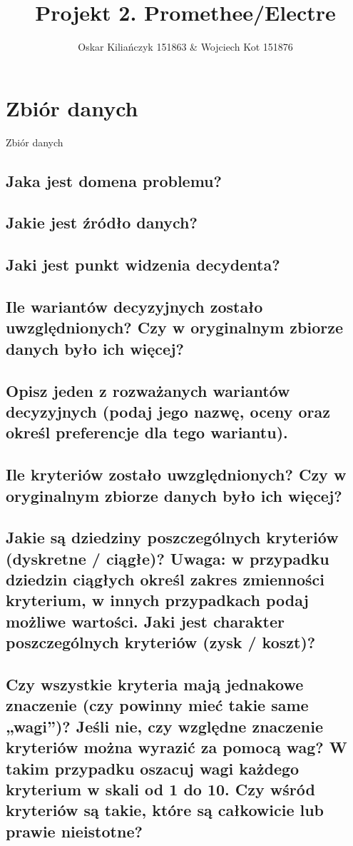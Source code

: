 \documentclass[11pt]{article}
\title{Projekt 2. Promethee/Electre}
\author{Oskar Kiliańczyk 151863 \& Wojciech Kot 151876}
\date{}
\begin{document}
\maketitle
\newpage

\section{Zbiór danych}
Zbiór danych
\subsection{Jaka jest domena problemu?}

\subsection{Jakie jest źródło danych?}

\subsection{Jaki jest punkt widzenia decydenta?}

\subsection{Ile wariantów decyzyjnych zostało uwzględnionych? Czy w oryginalnym zbiorze danych było ich więcej?}

\subsection{Opisz jeden z rozważanych wariantów decyzyjnych (podaj jego nazwę, oceny oraz określ preferencje dla tego wariantu).}

\subsection{Ile kryteriów zostało uwzględnionych? Czy w oryginalnym zbiorze danych było ich więcej?}

\subsection{Jakie są dziedziny poszczególnych kryteriów (dyskretne / ciągłe)? Uwaga: w przypadku dziedzin ciągłych określ zakres zmienności kryterium, w innych przypadkach podaj możliwe wartości. Jaki jest charakter poszczególnych kryteriów (zysk / koszt)?}

\subsection{Czy wszystkie kryteria mają jednakowe znaczenie (czy powinny mieć takie same „wagi”)? Jeśli nie, czy względne znaczenie kryteriów można wyrazić za pomocą wag? W takim przypadku oszacuj wagi każdego kryterium w skali od 1 do 10. Czy wśród kryteriów są takie, które są całkowicie lub prawie nieistotne?}
\end{document}
